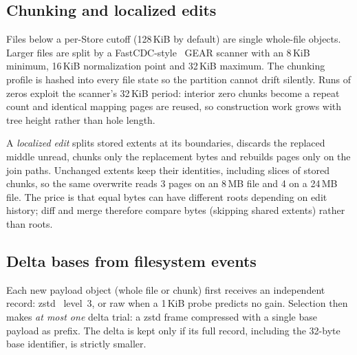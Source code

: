 \documentclass[letterpaper,twocolumn,10pt]{article}
\begin{document}
\subsection{Chunking and localized edits}
\label{sec:edits}

Files below a per-Store cutoff (128\,KiB by default) are single whole-file
objects. Larger files are split by a FastCDC-style~\cite{fastcdc} GEAR
scanner with an 8\,KiB minimum, 16\,KiB normalization point and 32\,KiB
maximum. The chunking profile is hashed into every file state so the
partition cannot drift silently. Runs of zeros exploit the scanner's
32\,KiB period: interior zero chunks become a repeat count and identical
mapping pages are reused, so construction work grows with tree height rather
than hole length.

A \emph{localized edit} splits stored extents at its boundaries, discards
the replaced middle unread, chunks only the replacement bytes and rebuilds
pages only on the join paths. Unchanged extents keep their identities,
including slices of stored chunks, so the same overwrite reads 3 pages on an
8\,MB file and 4 on a 24\,MB file. The price is that equal bytes can have
different roots depending on edit history; diff and merge therefore compare
bytes (skipping shared extents) rather than roots.

\subsection{Delta bases from filesystem events}
\label{sec:delta}

Each new payload object (whole file or chunk) first receives an independent
record: zstd~\cite{zstd} level~3, or raw when a 1\,KiB probe predicts no
gain. Selection then makes \emph{at most one} delta trial: a zstd frame
compressed with a single base payload as prefix. The delta is kept only if
its full record, including the 32-byte base identifier, is strictly smaller.
\end{document}
